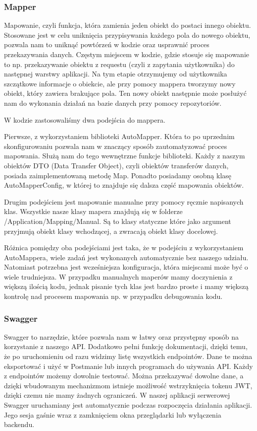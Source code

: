 \documentclass[a4paper,twoside,12pt]{book}
\begin{document}
\subsubsection{Mapper} 
Mapowanie, czyli funkcja, która zamienia jeden obiekt do postaci innego obiektu. Stosowane jest w celu uniknięcia przypisywania każdego pola do nowego obiektu, pozwala nam to uniknąć powtórzeń w kodzie oraz usprawnić proces przekazywania danych. Częstym miejscem w kodzie, gdzie stosuje się mapowanie to np. przekazywanie obiektu z requestu (czyli z zapytania użytkownika) do następnej warstwy aplikacji. Na tym etapie otrzymujemy od użytkownika szczątkowe informacje o obiekcie, ale przy pomocy mappera tworzymy nowy obiekt, który zawiera brakujące pola. Ten nowy obiekt następnie może posłużyć nam do wykonania działań na bazie danych przy pomocy repozytoriów. 

W kodzie zastosowaliśmy dwa podejścia do mappera. 

Pierwsze, z wykorzystaniem biblioteki AutoMapper. Która to po uprzednim skonfigurowaniu pozwala nam w znaczący sposób zautomatyzować proces mapowania. Służą nam do tego wewnętrzne funkcje biblioteki. Każdy z naszym obiektów DTO (Data Transfer Object), czyli obiektów transferów danych, posiada zaimplementowaną metodę Map. Ponadto posiadamy osobną klasę AutoMapperConfig, w której to znajduje się dalsza część mapowania obiektów.  

Drugim podejściem jest mapowanie manualne przy pomocy ręcznie napisanych klas. Wszystkie nasze klasy mapera znajdują się w folderze /Application/Mapping/Manual. Są to klasy statyczne które jako argument przyjmują obiekt klasy wchodzącej, a zwracają obiekt klasy docelowej.  

Różnica pomiędzy oba podejściami jest taka, że w podejściu z wykorzystaniem AutoMappera, wiele zadań jest wykonanych automatycznie bez naszego udziału. Natomiast potrzebna jest wcześniejsza konfiguracja, która miejscami może być o wiele trudniejsza. W przypadku manualnych maperów mamy doczynienia z większą ilością kodu, jednak pisanie tych klas jest bardzo proste i mamy większą kontrolę nad procesem mapowania np. w przypadku debugowania kodu. 

\subsubsection{Swagger}
Swagger to narzędzie, które pozwala nam w łatwy oraz przystępny sposób na korzystanie z naszego API. Dodatkowo pełni funkcję dokumentacji, dzięki temu, że po uruchomieniu od razu widzimy listę wszystkich endpointów. Dane te można eksportować i użyć w Postmanie lub innych programach do używania API. Każdy z endpointów możemy dowolnie testować. Można przekazywać dowolne dane, a dzięki wbudowanym mechanizmom istnieje możliwość wstrzyknięcia tokenu JWT, dzięki czemu nie mamy żadnych ograniczeń. W naszej aplikacji serwerowej Swagger uruchamiany jest automatycznie podczas rozpoczęcia działania aplikacji. Jego sesja gaśnie wraz z zamknięciem okna przeglądarki lub wyłączenia backendu.
\end{document}
